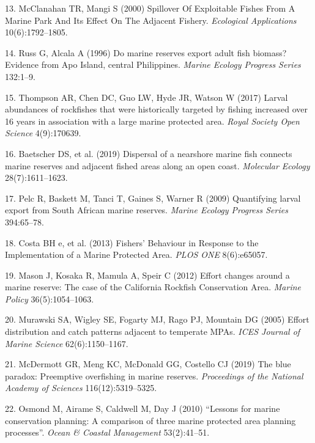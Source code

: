 \documentclass[9pt,twocolumn,twoside,lineno]{pnas-new}
\begin{document}
\leavevmode\hypertarget{ref-mcclanahan2000}{}%
13. McClanahan TR, Mangi S (2000) Spillover Of Exploitable Fishes From A
Marine Park And Its Effect On The Adjacent Fishery. \emph{Ecological
Applications} 10(6):1792--1805.

\leavevmode\hypertarget{ref-russ1996}{}%
14. Russ G, Alcala A (1996) Do marine reserves export adult fish
biomass? Evidence from Apo Island, central Philippines. \emph{Marine
Ecology Progress Series} 132:1--9.

\leavevmode\hypertarget{ref-thompson2017}{}%
15. Thompson AR, Chen DC, Guo LW, Hyde JR, Watson W (2017) Larval
abundances of rockfishes that were historically targeted by fishing
increased over 16 years in association with a large marine protected
area. \emph{Royal Society Open Science} 4(9):170639.

\leavevmode\hypertarget{ref-baetscher2019}{}%
16. Baetscher DS, et al. (2019) Dispersal of a nearshore marine fish
connects marine reserves and adjacent fished areas along an open coast.
\emph{Molecular Ecology} 28(7):1611--1623.

\leavevmode\hypertarget{ref-pelc2009}{}%
17. Pelc R, Baskett M, Tanci T, Gaines S, Warner R (2009) Quantifying
larval export from South African marine reserves. \emph{Marine Ecology
Progress Series} 394:65--78.

\leavevmode\hypertarget{ref-costa2013}{}%
18. Costa BH e, et al. (2013) Fishers' Behaviour in Response to the
Implementation of a Marine Protected Area. \emph{PLOS ONE} 8(6):e65057.

\leavevmode\hypertarget{ref-mason2012}{}%
19. Mason J, Kosaka R, Mamula A, Speir C (2012) Effort changes around a
marine reserve: The case of the California Rockfish Conservation Area.
\emph{Marine Policy} 36(5):1054--1063.

\leavevmode\hypertarget{ref-murawski2005}{}%
20. Murawski SA, Wigley SE, Fogarty MJ, Rago PJ, Mountain DG (2005)
Effort distribution and catch patterns adjacent to temperate MPAs.
\emph{ICES Journal of Marine Science} 62(6):1150--1167.

\leavevmode\hypertarget{ref-mcdermott2019}{}%
21. McDermott GR, Meng KC, McDonald GG, Costello CJ (2019) The blue
paradox: Preemptive overfishing in marine reserves. \emph{Proceedings of
the National Academy of Sciences} 116(12):5319--5325.

\leavevmode\hypertarget{ref-osmond2010}{}%
22. Osmond M, Airame S, Caldwell M, Day J (2010) ``Lessons for marine
conservation planning: A comparison of three marine protected area
planning processes''. \emph{Ocean \& Coastal Management} 53(2):41--51.
\end{document}

